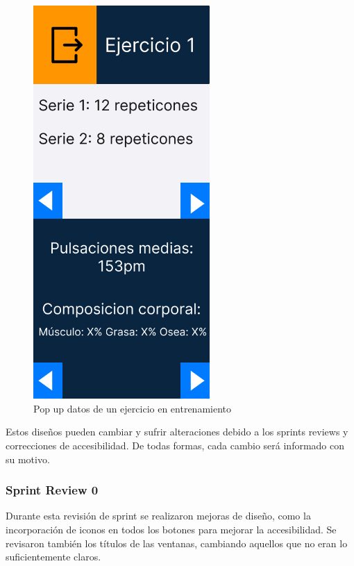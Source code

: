 \begin{figure}[H]
   \centering
    \includegraphics[width=0.6\textwidth]{fotos/Frame 35.png}
    \caption{Pop up datos de un ejercicio en entrenamiento}
    \label{fig:Pop up datos de un ejercicio en entrenamiento}
\end{figure}


Estos diseños pueden cambiar y sufrir alteraciones debido a los sprints reviews y correcciones de accesibilidad. De todas formas, cada cambio será informado con su motivo.

\subsubsection{Sprint Review 0}
Durante esta revisión de sprint se realizaron mejoras de diseño, como la incorporación de iconos en todos los botones para mejorar la accesibilidad. Se revisaron también los títulos de las ventanas, cambiando aquellos que no eran lo suficientemente claros.

